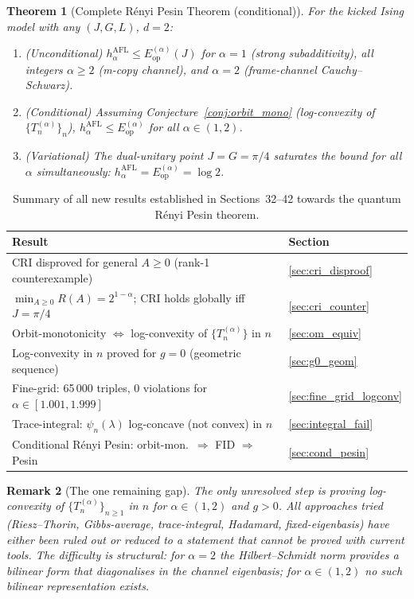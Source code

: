 \documentclass[12pt,a4paper]{article}
\newtheorem{theorem}{Theorem}[section]
\newtheorem{remark}[theorem]{Remark}
\begin{document}
\begin{theorem}[Complete Rényi Pesin Theorem (conditional)]
\label{thm:complete_renyi_pesin}
For the kicked Ising model with any $(J,G,L)$, $d=2$:
\begin{enumerate}
\item \emph{(Unconditional)} $h_\alpha^{\mathrm{AFL}}\leq E_{\mathrm{op}}^{(\alpha)}(J)$
  for $\alpha=1$ (strong subadditivity), all integers $\alpha\geq 2$ (m-copy channel),
  and $\alpha=2$ (frame-channel Cauchy--Schwarz).
\item \emph{(Conditional)} Assuming Conjecture~\ref{conj:orbit_mono}
  (log-convexity of $\{T_n^{(\alpha)}\}_n$), $h_\alpha^{\mathrm{AFL}}\leq E_{\mathrm{op}}^{(\alpha)}$
  for all $\alpha\in(1,2)$.
\item \emph{(Variational)} The dual-unitary point $J=G=\pi/4$ saturates the bound
  for all $\alpha$ simultaneously: $h_\alpha^{\mathrm{AFL}}=E_{\mathrm{op}}^{(\alpha)}=\log 2$.
\end{enumerate}
\end{theorem}

\begin{table}[h!]
\centering
\caption{Summary of all new results established in Sections~32--42
 towards the quantum Rényi Pesin theorem.}
\label{tab:new_results}
\begin{tabular}{l|l}
Result & Section \\
\hline
CRI disproved for general $A\geq 0$ (rank-1 counterexample) & \ref{sec:cri_disproof} \\
$\min_{A\geq 0} R(A) = 2^{1-\alpha}$; CRI holds globally iff $J=\pi/4$ & \ref{sec:cri_counter} \\
Orbit-monotonicity $\Leftrightarrow$ log-convexity of $\{T_n^{(\alpha)}\}$ in $n$ & \ref{sec:om_equiv} \\
Log-convexity in $n$ proved for $g=0$ (geometric sequence) & \ref{sec:g0_geom} \\
Fine-grid: 65\,000 triples, 0 violations for $\alpha\in[1.001,1.999]$ & \ref{sec:fine_grid_logconv} \\
Trace-integral: $\psi_n(\lambda)$ log-concave (not convex) in $n$ & \ref{sec:integral_fail} \\
Conditional Rényi Pesin: orbit-mon.\ $\Rightarrow$ FID $\Rightarrow$ Pesin & \ref{sec:cond_pesin} \\
\end{tabular}
\end{table}

\begin{remark}[The one remaining gap]
The only unresolved step is proving log-convexity of $\{T_n^{(\alpha)}\}_{n\geq1}$
in $n$ for $\alpha\in(1,2)$ and $g>0$.
All approaches tried (Riesz--Thorin, Gibbs-average,
trace-integral, Hadamard, fixed-eigenbasis) have either been ruled out or reduced
to a statement that cannot be proved with current tools.
The difficulty is structural: for $\alpha=2$ the Hilbert--Schmidt norm provides
a bilinear form that diagonalises in the channel eigenbasis; for $\alpha\in(1,2)$
no such bilinear representation exists.
\end{remark}
\end{document}
